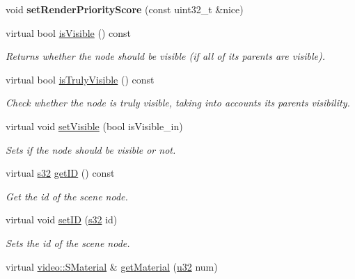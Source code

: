 \begin{DoxyCompactItemize}
\item 
void {\bfseries set\+Render\+Priority\+Score} (const uint32\+\_\+t \&nice)\hypertarget{classirr_1_1scene_1_1ISceneNode_aa5d0004d14fd9a23af3f835a2c7c6111}{}\label{classirr_1_1scene_1_1ISceneNode_aa5d0004d14fd9a23af3f835a2c7c6111}

\item 
virtual bool \hyperlink{classirr_1_1scene_1_1ISceneNode_a1aef4f0feccebcd0d38373beadbc1827}{is\+Visible} () const 
\begin{DoxyCompactList}\small\item\em Returns whether the node should be visible (if all of its parents are visible). \end{DoxyCompactList}\item 
virtual bool \hyperlink{classirr_1_1scene_1_1ISceneNode_aa7065e757724f61d4a91d25db25c3a2b}{is\+Truly\+Visible} () const 
\begin{DoxyCompactList}\small\item\em Check whether the node is truly visible, taking into accounts its parents\textquotesingle{} visibility. \end{DoxyCompactList}\item 
virtual void \hyperlink{classirr_1_1scene_1_1ISceneNode_a7a5de878c7084088646f07afaac0a73f}{set\+Visible} (bool is\+Visible\+\_\+in)
\begin{DoxyCompactList}\small\item\em Sets if the node should be visible or not. \end{DoxyCompactList}\item 
virtual \hyperlink{namespaceirr_ac66849b7a6ed16e30ebede579f9b47c6}{s32} \hyperlink{classirr_1_1scene_1_1ISceneNode_a8f695e36340a9bb32f7e655fe4c1ea97}{get\+ID} () const 
\begin{DoxyCompactList}\small\item\em Get the id of the scene node. \end{DoxyCompactList}\item 
virtual void \hyperlink{classirr_1_1scene_1_1ISceneNode_ade60c630c4768200b1d15debbd00fe0e}{set\+ID} (\hyperlink{namespaceirr_ac66849b7a6ed16e30ebede579f9b47c6}{s32} id)
\begin{DoxyCompactList}\small\item\em Sets the id of the scene node. \end{DoxyCompactList}\item 
virtual \hyperlink{classirr_1_1video_1_1SMaterial}{video\+::\+S\+Material} \& \hyperlink{classirr_1_1scene_1_1ISceneNode_a1f44d8cf753b2e4c17c90d4fc2ed05b2}{get\+Material} (\hyperlink{namespaceirr_a0416a53257075833e7002efd0a18e804}{u32} num)

\end{DoxyCompactItemize}
